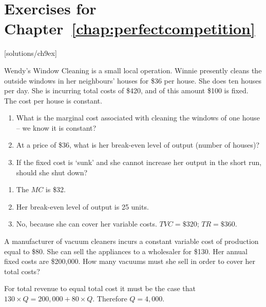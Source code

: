 \newpage
\section*{Exercises for Chapter~\ref{chap:perfectcompetition}}

\begin{enumialphparenastyle}

[solutions/ch9ex]

\begin{ex}\label{ex:ch9ex1}
Wendy's Window Cleaning is a small local operation. Winnie presently cleans the outside windows in her neighbours' houses for \$36 per house. She does ten houses per day. She is incurring total costs of \$420, and of this amount \$100 is fixed. The cost per house is constant.
\begin{enumerate}
	\item	What is the marginal cost associated with cleaning the windows of one house -- we know it is constant?
	\item	At a price of \$36, what is her break-even level of output (number of houses)?
	\item	If the fixed cost is `sunk' and she cannot increase her output in the short run, should she shut down?
\end{enumerate}
\begin{sol}
\begin{enumerate}
	\item	The $MC$ is \$32.
	\item	Her break-even level of output is 25 units.
	\item	No, because she can cover her variable costs. $TVC=\$320$; $TR=\$360$.
\end{enumerate}
\end{sol}
\end{ex}

\begin{ex}\label{ex:ch9ex2}
A manufacturer of vacuum cleaners incurs a constant variable cost of production equal to \$80. She can sell the appliances to a wholesaler for \$130. Her annual fixed costs are \$200,000.	How many vacuums must she sell in order to cover her total costs?
\begin{sol}
	For total revenue to equal total cost it must be the case that $130\times Q=200,000+80\times Q$. Therefore $Q=4,000$.
	
\end{sol}
\end{ex}


\end{enumialphparenastyle}
